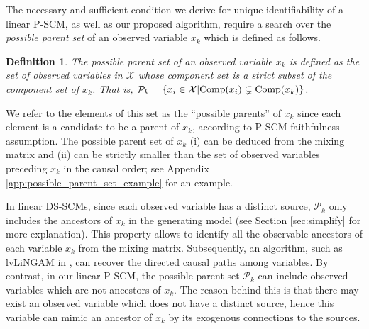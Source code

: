 \documentclass[12pt]{article}
\newtheorem{definition}{Definition}
\newcommand{\setX}{\mathcal{X}}
\begin{document}
The necessary and sufficient condition we derive for unique identifiability of a linear P-SCM, as well as our proposed algorithm, require a search over the {\it{possible parent set}} of an observed variable $x_k$ which is defined as follows.

\vspace{-2mm}
\begin{definition}\label{def:pp_set} 
The \emph{possible parent set} of an observed variable $x_k$ is defined as the set of observed variables in $\setX$ whose component set is a strict subset of the component set of $x_k$. That is,
$\mathcal{P}_k =\{ x_i\in \setX | {\rm{Comp}}(x_i)\subsetneq {\rm{Comp}}(x_k)\}$.
\end{definition}
\vspace{-2mm}

We refer to the elements of this set as the ``possible parents'' of $x_k$ since each element is a candidate to be a parent of $x_k$, according to P-SCM faithfulness assumption. The possible parent set of $x_k$ (i) can be deduced from the mixing matrix and (ii) can be strictly smaller than the set of observed variables preceding $x_k$ in the causal order; see Appendix \ref{app:possible_parent_set_example} for an example.

In linear DS-SCMs, since each observed variable has a distinct source, $\mathcal{P}_k$ only includes the ancestors of $x_k$ in the generating model (see Section \ref{sec:simplify} for more explanation).
This property allows to identify all the observable ancestors of each variable $x_k$ from the mixing matrix. Subsequently, an algorithm, such as lvLiNGAM in \citep{salehkaleybar2020learning}, can recover the directed causal paths among variables. By contrast, in our linear P-SCM, the possible parent set $\mathcal{P}_k$ can include observed variables which are not ancestors of $x_k$. The reason behind this is that there may exist an observed variable which does not have a distinct source, hence this variable can mimic an ancestor of $x_k$ by its exogenous connections to the sources. 
\end{document}
